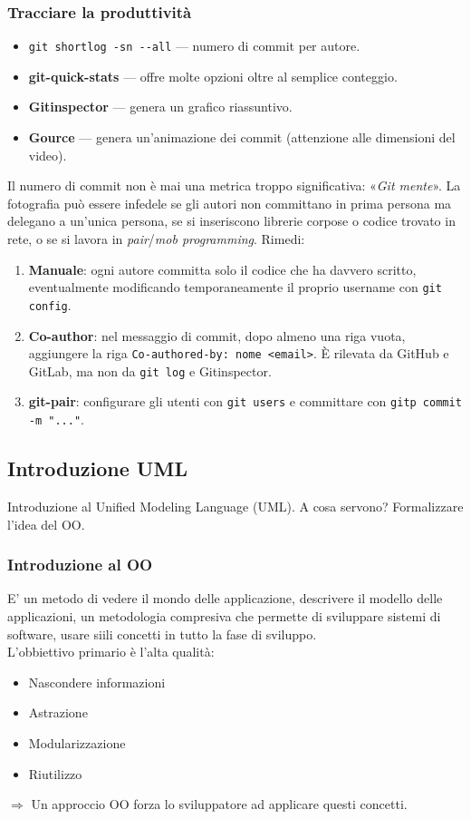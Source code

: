 \documentclass[a4paper,12pt]{article}
\begin{document}
\subsubsection{Tracciare la produttività}

\begin{itemize}
  \item \verb|git shortlog -sn --all| --- numero di commit per autore.
  \item \textbf{git-quick-stats} --- offre molte opzioni oltre al semplice conteggio.
  \item \textbf{Gitinspector} --- genera un grafico riassuntivo.
  \item \textbf{Gource} --- genera un'animazione dei commit (attenzione alle dimensioni
        del video).
\end{itemize}

Il numero di commit non è mai una metrica troppo significativa: «\emph{Git mente}». La
fotografia può essere infedele se gli autori non committano in prima persona ma delegano
a un'unica persona, se si inseriscono librerie corpose o codice trovato in rete, o se si
lavora in \emph{pair}/\emph{mob programming}. Rimedi:
\begin{enumerate}
  \item \textbf{Manuale}: ogni autore committa solo il codice che ha davvero scritto,
        eventualmente modificando temporaneamente il proprio username con
        \verb|git config|.
  \item \textbf{Co-author}: nel messaggio di commit, dopo almeno una riga vuota,
        aggiungere la riga \verb|Co-authored-by: nome <email>|.
        È rilevata da GitHub e GitLab, ma non da \texttt{git log} e Gitinspector.
  \item \textbf{git-pair}: configurare gli utenti con \verb|git users| e committare con
        \verb|gitp commit -m "..."|.
\end{enumerate}
\newpage
\subsection{Introduzione UML}
Introduzione al Unified Modeling Language (UML). A cosa servono? Formalizzare l'idea del OO.
\subsubsection{Introduzione al OO}
E' un metodo di vedere il mondo delle applicazione, descrivere il modello delle applicazioni, un metodologia compresiva che permette di sviluppare sistemi di software, usare siili concetti in tutto la fase di sviluppo.\\
L'obbiettivo primario è l'alta qualità:
\begin{itemize}
  \item Nascondere informazioni
  \item Astrazione
  \item Modularizzazione
  \item Riutilizzo
\end{itemize}
$\Rightarrow$ Un approccio OO forza lo sviluppatore ad applicare questi concetti.\\
\end{document}
